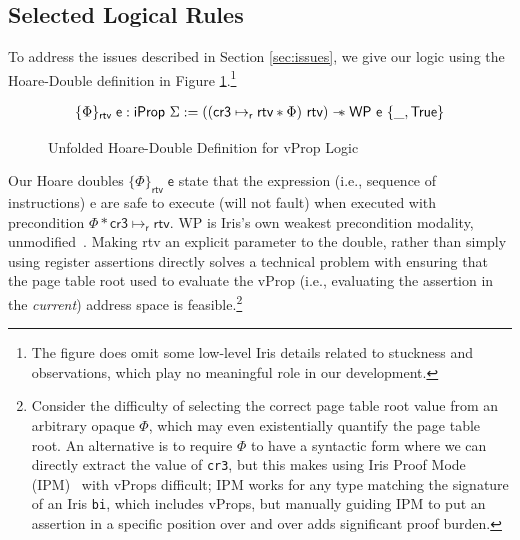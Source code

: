 \subsection{Selected Logical Rules}
\label{sec:selected_rules}
To address the issues described in Section \ref{sec:issues}, we give our logic using
the Hoare-Double definition in Figure \ref{fig:wpddefinition}.\footnote{The figure does
omit some low-level Iris details related to stuckness and observations, which play no meaningful
role in our development.}
\begin{figure} 
  \[
  \begin{array}{l}
    \{ \Phi \}_\mathsf{ rtv }\;\textsf{e} : \textsf{iProp }\Sigma := 
   ((\textsf{cr3} \mapsto_{\textsf{r}} \textsf{rtv} \ast \Phi) \textsf{ rtv}) \mathrel{-\!\!\ast} \textsf{WP e } \{\_, \textsf{True} \}
    \end{array}
  \]
\caption{Unfolded Hoare-Double Definition for \textsf{vProp} Logic }
\label{fig:wpddefinition}
\end{figure}
Our Hoare doubles $\{\Phi\}_\textsf{rtv}\;\textsf{e}$ state that the expression (i.e., sequence of instructions)
\textsf{e} are safe to execute (will not fault)
when executed with precondition $\Phi\ast\textsf{cr3}\mapsto_{\textsf{r}} \textsf{rtv}$.
\textsf{WP} is Iris's own weakest precondition modality, unmodified~\cite{jung2018iris}.
Making \textsf{rtv} an explicit parameter to the double, rather than simply using register assertions
directly solves a technical problem with ensuring that the page table root used to evaluate
the \textsf{vProp} (i.e., evaluating the assertion in the \emph{current}) address space
is feasible.\footnote{Consider the difficulty of selecting the correct page table root value from an arbitrary
opaque $\Phi$, which may even existentially quantify the page table root. An alternative is to
require $\Phi$ to have a syntactic form where we can directly extract the value of \lstinline|cr3|,
but this makes using Iris Proof Mode (IPM)~\cite{Krebbers:2017:IPH:3009837.3009855} with \textsf{vProps}
  difficult; IPM works for any type matching the signature of an Iris \lstinline|bi|, which includes
  \textsf{vProp}s, but manually guiding IPM to put an assertion in a specific position over and over adds
  significant proof burden.
}

